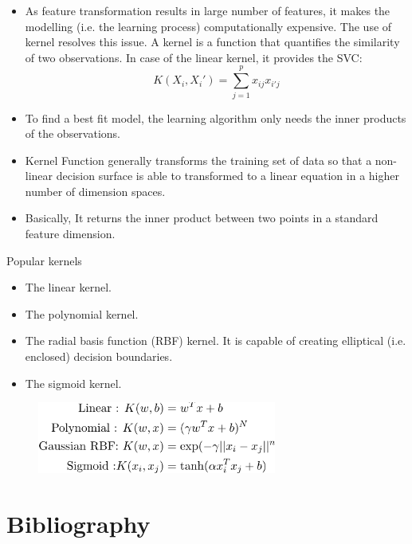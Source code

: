\documentclass{beamer}
\begin{document}
\begin{frame}
\begin{itemize} 
  \item As feature transformation results in large number of features, it makes the modelling (i.e. the learning process) computationally expensive. The use of kernel resolves this issue. A kernel is a function that quantifies the similarity of two observations. In case of the linear kernel, it provides the SVC:
  \[K(X_i,X_i')=\sum_{j=1}^p x_{ij}x_{i'j}\]
  \item To find a best fit model, the learning algorithm only needs the inner products of the observations. 
  \item Kernel Function generally transforms the training set of data so that a non-linear decision surface is able to transformed to a linear equation in a higher number of dimension spaces. 
  \item Basically, It returns the inner product between two points in a standard feature dimension.
\end{itemize}
\end{frame}

\begin{frame}{Popular kernels}
  \begin{itemize}
    \item The linear kernel.
    \item The polynomial kernel.
    \item The radial basis function (RBF) kernel. It is capable of creating elliptical (i.e. enclosed) decision boundaries.
    \item The sigmoid kernel.
  \end{itemize}
  \begin{figure}
    \includegraphics[width=0.7\textwidth]{kernelsSVM}
  \end{figure}
\end{frame}

\section{Bibliography}


\end{document}
